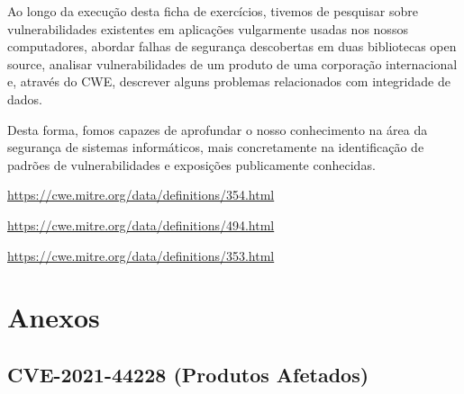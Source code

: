 \documentclass[11t]{article}
\begin{document}
Ao longo da execução desta ficha de exercícios, tivemos de pesquisar sobre vulnerabilidades existentes em aplicações vulgarmente usadas nos nossos computadores, abordar falhas de segurança descobertas em duas bibliotecas open source, analisar vulnerabilidades de um produto de uma corporação internacional e, através do CWE, descrever alguns problemas relacionados com integridade de dados.

Desta forma, fomos capazes de aprofundar o nosso conhecimento na área da segurança de sistemas informáticos, mais concretamente na identificação de padrões de vulnerabilidades e exposições publicamente conhecidas.

\clearpage
\begin{thebibliography}{}

\url{https://cwe.mitre.org/data/definitions/354.html}

\url{https://cwe.mitre.org/data/definitions/494.html}

\url{https://cwe.mitre.org/data/definitions/353.html}

\end{thebibliography}

\clearpage

\section*{Anexos}

\subsection*{CVE-2021-44228 (Produtos Afetados)}
\end{document}
